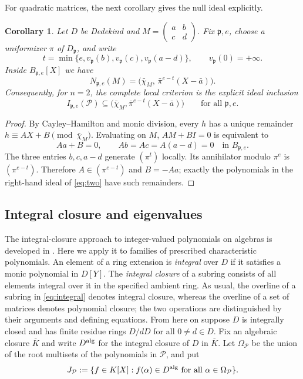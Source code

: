 \documentclass[11pt]{amsart}
\newtheorem{corollary}[theorem]{Corollary}
\theoremstyle{definition}
\theoremstyle{remark}
\begin{document}
For quadratic matrices, the next corollary gives the null ideal explicitly.
\begin{corollary}\label{cor:two}
Let $D$ be Dedekind and
$M=\left(\begin{smallmatrix}a&b\\c&d\end{smallmatrix}\right)$.
Fix $\mathfrak p,e$, choose a uniformizer $\pi$ of $D_{\mathfrak p}$,
and write
\[
t=\min\{e,v_{\mathfrak p}(b),v_{\mathfrak p}(c),
                          v_{\mathfrak p}(a-d)\},\qquad v_{\mathfrak p}(0)=+\infty.
\]
Inside $B_{\mathfrak p,e}[X]$ we have
\begin{equation}\label{eq:two}
N_{\mathfrak p,e}(M)
=\bigl(\bar\chi_M,\,\bar\pi^{e-t}(X-\bar a)\bigr).
\end{equation}
Consequently, for $n=2$, the complete local criterion is the explicit
ideal inclusion
\[
I_{\mathfrak p,e}(\mathcal P)\subseteq
\bigl(\bar\chi_M,\bar\pi^{e-t}(X-\bar a)\bigr)
\qquad\text{for all }\mathfrak p,e.
\]
\end{corollary}
\begin{proof}
By Cayley--Hamilton and monic division, every $h$ has a unique
remainder $h\equiv AX+B\pmod{\bar\chi_M}$. Evaluating on $M$,
$AM+BI=0$ is equivalent to
\[
 Aa+B=0,\qquad Ab=Ac=A(a-d)=0
             \quad\text{in }B_{\mathfrak p,e}.
\]
The three entries $b,c,a-d$ generate $(\pi^t)$ locally.
Its annihilator modulo $\pi^e$ is $(\pi^{e-t})$.
Therefore $A\in(\pi^{e-t})$ and $B=-Aa$;
exactly the polynomials in the right-hand ideal of \eqref{eq:two}
have such remainders.
\end{proof}

\subsection{Integral closure and eigenvalues}
The integral-closure approach to integer-valued polynomials on algebras
is developed in \cite{PeruginelliWerner2014}. Here we apply it to
families of prescribed characteristic polynomials.
An element of a ring extension is \emph{integral} over $D$ if it
satisfies a monic polynomial in $D[Y]$. The \emph{integral closure}
of a subring consists of all elements integral over it in the
specified ambient ring. As usual, the overline of a subring in
\eqref{eq:integral} denotes integral closure, whereas the overline of
a set of matrices denotes polynomial closure; the two operations are
distinguished by their arguments and defining equations.
From here on suppose $D$ is integrally closed and has finite residue rings
$D/dD$ for all $0\ne d\in D$.
Fix an algebraic closure $\overline K$ and write $D^{\rm alg}$ for the
integral closure of $D$ in $\overline K$. Let $\Omega_{\mathcal P}$ be the union
of the root multisets of the polynomials in $\mathcal P$, and put
\[
J_{\mathcal P}:=\{f\in K[X]:
                f(\alpha)\in D^{\rm alg}\text{ for all }\alpha\in\Omega_{\mathcal P}\}.
\]
\end{document}
